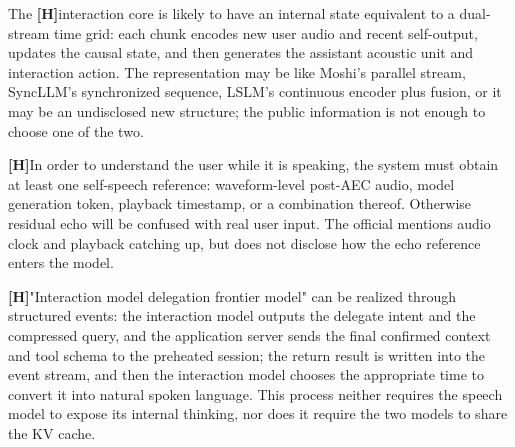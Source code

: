 \documentclass[UTF8,fontset=none,a4paper,10pt]{ctexart}
\newcommand{\Hyp}{\textcolor{hypothesis}{\textbf{[H]}}}
\begin{document}
The \Hyp interaction core is likely to have an internal state equivalent to a dual-stream time grid: each chunk encodes new user audio and recent self-output, updates the causal state, and then generates the assistant acoustic unit and interaction action. The representation may be like Moshi's parallel stream, SyncLLM's synchronized sequence, LSLM's continuous encoder plus fusion, or it may be an undisclosed new structure; the public information is not enough to choose one of the two.

\Hyp In order to understand the user while it is speaking, the system must obtain at least one self-speech reference: waveform-level post-AEC audio, model generation token, playback timestamp, or a combination thereof. Otherwise residual echo will be confused with real user input. The official mentions audio clock and playback catching up, but does not disclose how the echo reference enters the model.

\Hyp "Interaction model delegation frontier model" can be realized through structured events: the interaction model outputs the delegate intent and the compressed query, and the application server sends the final confirmed context and tool schema to the preheated session; the return result is written into the event stream, and then the interaction model chooses the appropriate time to convert it into natural spoken language. This process neither requires the speech model to expose its internal thinking, nor does it require the two models to share the KV cache.
\end{document}
